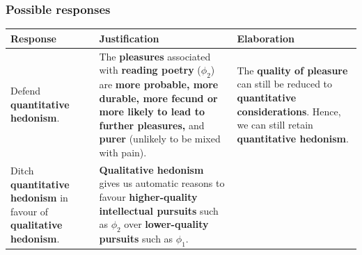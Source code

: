 \documentclass[11pt]{article}
\begin{document}
\subsubsection{Possible responses}
\label{sec:org7dc215e}
\begin{center}
\begin{tabular}{|m{10em}|m{15em}|m{10em}|}
\hline
Response & Justification & Elaboration\\
\hline
Defend \textbf{quantitative hedonism}. & The \textbf{pleasures} associated with \textbf{reading poetry} (\(\phi_2\)) are \textbf{more probable, more durable, more fecund or more likely to lead to further pleasures,} and \textbf{purer} (unlikely to be mixed with pain). & The \textbf{quality of pleasure} can still be reduced to \textbf{quantitative considerations}. Hence, we can still retain \textbf{quantitative hedonism}.\\
\hline
Ditch \textbf{quantitative hedonism} in favour of \textbf{qualitative hedonism}. & \textbf{Qualitative hedonism} gives us automatic reasons to favour \textbf{higher-quality intellectual pursuits} such as \(\phi_2\) over \textbf{lower-quality pursuits} such as \(\phi_1\). & \\
\hline
\end{tabular}
\end{center}
 \newpage
\end{document}

